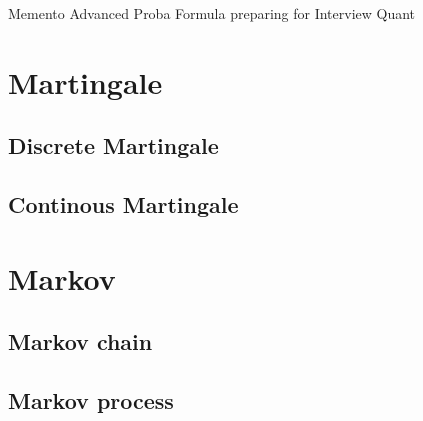 \documentclass[a4paper,10pt]{article}
\begin{document}
\begin{center}Memento Advanced Proba Formula preparing for Interview Quant\end{center}
\section{Martingale}
\subsection{Discrete Martingale}
\subsection{Continous Martingale}
\section{Markov}
\subsection{Markov chain}
\subsection{Markov process}
%
%
\end{document}
